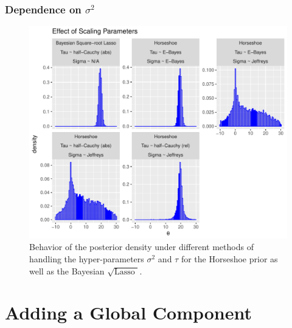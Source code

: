 \documentclass[10pt]{beamer}
\theoremstyle{plain}
\def\sql{$\sqrt{\text{Lasso }}$}
\begin{document}
\begin{frame}
	\frametitle{Dependence on $\sigma^2$}
	\begin{figure}%
\centering
\includegraphics[width=0.75\columnwidth]{art/effect_of_sigma}%
\caption{Behavior of the posterior density under different methods of handling the hyper-parameters $\sigma^2$ and $\tau$ for the Horseshoe prior as well as the Bayesian \sql{}. }%
\label{fig:effect-sigma}%
	\end{figure}
\end{frame}

\section{Adding a Global Component}
\end{document}

